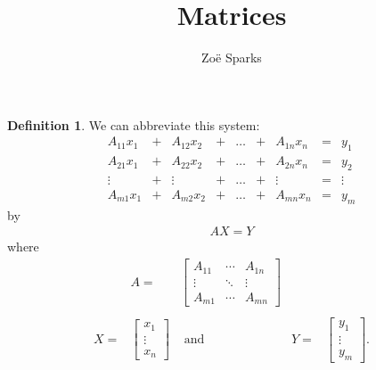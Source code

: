 \documentclass[12pt]{article}
\title{Matrices}
\author{Zoë Sparks}
\begin{document}
\theoremstyle{definition}

\newtheorem{thm}{Theorem}
\newtheorem*{nthm}{Theorem}
\newtheorem{sthm}{}[thm]
\newtheorem{lemma}{Lemma}[thm]
\newtheorem*{nlemma}{Lemma}
\newtheorem{cor}{Corollary}[thm]
\newtheorem*{prop}{Property}
\newtheorem*{defn}{Definition}
\newtheorem*{comm}{Comment}
\newtheorem*{exm}{Example}

\maketitle

\begin{defn}
  We can abbreviate this system:
  \begin{equation} \label{eq:syslin}
  \begin{array}{ccccccccc}
    A_{11}x_1 & + & A_{12}x_2 & + & \ldots & + & A_{1n}x_n & = & y_1\\
    A_{21}x_1 & + & A_{22}x_2 & + & \ldots & + & A_{2n}x_n & = & y_2\\
    \vdots    & + & \vdots    & + & \ldots & + & \vdots    & = & \vdots\\
    A_{m1}x_1 & + & A_{m2}x_2 & + & \ldots & + & A_{mn}x_n & = & y_m
  \end{array}
  \end{equation}
  by
  \begin{align*}
    AX = Y
  \end{align*}
  where\\
  \[
    \begin{array}{cccll}
      &A =
      &\begin{bmatrix}
        A_{11} & \cdots & A_{1n}\\
        \vdots & \ddots & \vdots\\
        A_{m1} & \cdots & A_{mn}
      \end{bmatrix}&&\\\\
      X =&
      \begin{bmatrix}
        x_{1} \\
        \vdots\\
        x_{n}
      \end{bmatrix}&
      \text{ and }
      &Y =&
      \begin{bmatrix}
        y_{1} \\
        \vdots\\
        y_{m}
      \end{bmatrix}.
    \end{array}
  \]\\


\end{defn}
\end{document}
